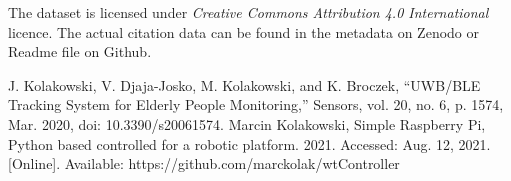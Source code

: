 \documentclass[conference]{IEEEtran}
\begin{document}
The dataset is licensed under \textit{Creative Commons Attribution 4.0 International} licence. The actual citation data can be found in the metadata on Zenodo or Readme file on Github.




\begin{thebibliography}{00} 
 J. Kolakowski, V. Djaja-Josko, M. Kolakowski, and K. Broczek, “UWB/BLE Tracking System for Elderly People Monitoring,” Sensors, vol. 20, no. 6, p. 1574, Mar. 2020, doi: 10.3390/s20061574.
 Marcin Kolakowski, Simple Raspberry Pi, Python based controlled for a robotic platform. 2021. Accessed: Aug. 12, 2021. [Online]. Available: https://github.com/marckolak/wtController


\end{thebibliography}
\vspace{12pt}
\color{red}
\end{document}
